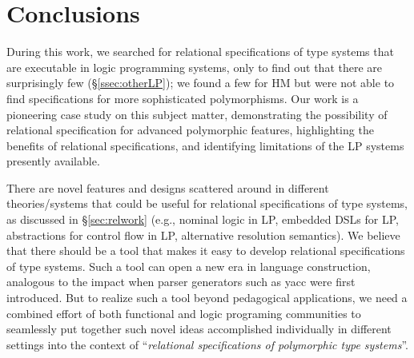\documentclass[runningheads,a4paper]{llncs}
\begin{document}



\section{Conclusions}\label{sec:concl}\vspace*{-.5ex}
During this work, we searched for relational specifications of type systems
that are executable in logic programming systems, only to find out that there
are surprisingly few (\S\ref{ssec:otherLP}); we found a few for HM but were not
able to find specifications for more sophisticated polymorphisms.
Our work is a pioneering case study on this subject matter,
demonstrating the possibility of relational specification for advanced
polymorphic features, highlighting the benefits of relational specifications,
and identifying limitations of the LP systems presently available.

There are novel features and designs scattered around in different
theories/systems that could be useful for relational specifications of
type systems, as discussed in \S\ref{sec:relwork} (e.g.,
nominal logic in LP, embedded DSLs for LP, abstractions
for control flow in LP, alternative resolution semantics). We believe
that there should be a tool that makes it easy to develop relational
specifications of type systems. Such a tool can open a new era
in language construction, analogous to the impact when parser generators
such as yacc were first introduced. But to realize such a tool beyond
pedagogical applications, we need a combined effort of
both functional and logic programing communities to seamlessly put together
such novel ideas accomplished individually in different settings into
the context of ``\emph{relational specifications of polymorphic type systems}''.
\end{document}
